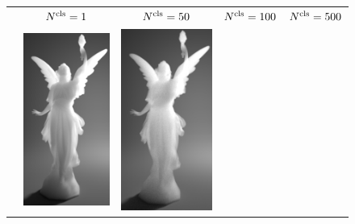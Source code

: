\begin{figure}
    \centering
    \setlength{\resLen}{1.55in}
    \setlength{\raiseLen}{.75in}
    \addtolength{\tabcolsep}{-3.5pt}
    \small
	\begin{tabular}{ccccc}
		& ${N^\text{cls}}=1$ & ${N^\text{cls}}=50$ & ${N^\text{cls}}=100$ & ${N^\text{cls}}=500$
		\\
		\raisebox{\raiseLen}{\rotatebox[origin=c]{90}{$\radius_i=300\text{nm}$}} &
		\includegraphics[height=\resLen]{images/lucy/N1_300nm.jpg} &
		\includegraphics[height=\resLen]{images/lucy/N50_300nm.jpg} &

\end{tabular}
\end{figure}
